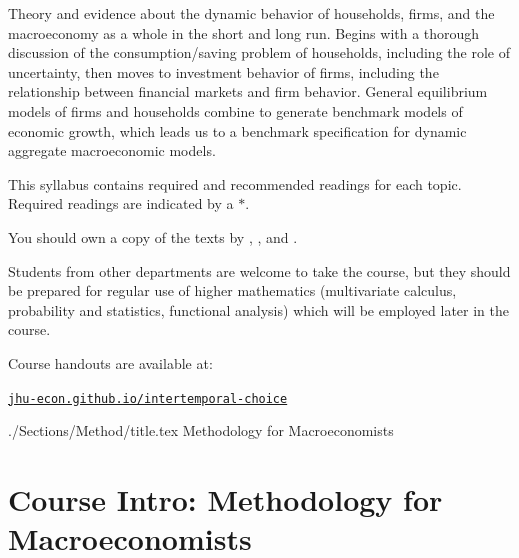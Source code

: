 \documentclass{\econtex}\newcommand{\texname}{Syllabus}
\begin{document}
\medskip\medskip

Theory and evidence about the dynamic behavior of households, firms, and the macroeconomy as a whole in the short and long run.  Begins with a thorough discussion of the consumption/saving problem of households, including the role of uncertainty, then moves to investment behavior of firms, including the relationship between financial markets and firm behavior.  General equilibrium models of firms and households combine to generate benchmark models of economic growth, which leads us to a benchmark specification for dynamic aggregate macroeconomic models.

This syllabus contains required and recommended readings for each
topic.  Required readings are indicated by a ${*}$. 

You should own a copy of the texts by \cite{blanchard&fischer:text}, \cite{deatonUnderstandingC}, 
\cite{romer:text} and \cite{lsRecurse}.

{\small Students from other departments are welcome to take the course, but 
they should be prepared for regular use of higher mathematics (multivariate
calculus, probability and statistics, functional analysis) which will be employed
later in the course.}

\medskip\medskip
\noindent Course handouts are available at: 
\medskip

\texttt{\href{https://jhu-econ.github.io/intertemporal-choice}{jhu-econ.github.io/intertemporal-choice}}

\pagebreak


\begin{verbatimwrite}{./Sections/Method/title.tex}
Methodology for Macroeconomists
\end{verbatimwrite}
\section{Course Intro: Methodology for Macroeconomists}
\end{document}
